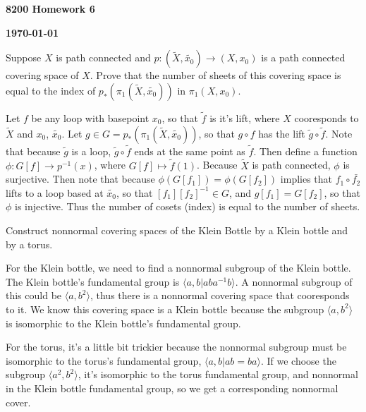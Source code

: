 \documentclass[12pt]{article}
\begin{document}
\begin{newtitle}
  \begin{center}
    \textbf{\Huge 8200 Homework 6}
  \end{center}
  \hfill \textbf{\today}
\end{newtitle}

\begin{statement}
  Suppose $X$ is path connected and $p: (\tilde{X},\tilde{x_0}) \to (X,x_0)$ is a path connected covering space of $X$. 
  Prove that the number of sheets of this covering space is equal to the index of $p_*(\pi_1(\tilde{X},\tilde{x_0}))$ 
  in $\pi_1(X,x_0)$.
\end{statement}

\begin{newproof}
  Let $f$ be any loop with basepoint $x_0$, so that $\tilde{f}$ is it's lift, where $X$ cooresponds to 
  $\tilde{X}$ and $x_0$, $\tilde{x_0}$. Let $g \in G=p_*(\pi_1(\tilde{X},\tilde{x_0}))$, so that $g \circ f$ has 
  the lift $\tilde{g} \circ \tilde{f}$. Note that because $\tilde{g}$ is a loop, $\tilde{g} \circ 
  \tilde{f}$ ends at the same point as $\tilde{f}$. Then define a function $\phi: G[f] \to p^{-1}(x)$, 
  where $G[f] \mapsto \tilde{f}(1)$. Because $\tilde{X}$ is path connected, $\phi$ is surjective. 
  Then note that because $\phi(G[f_1])=\phi(G[f_2])$ implies that $f_1 \circ \bar{f_2}$ 
  lifts to a loop based at $\tilde{x_0}$, so that $[f_1][f_2]^{-1} \in G$, and $g[f_1]=G[f_2]$, so 
  that $\phi$ is injective. Thus the number of cosets (index) is equal to the number of sheets. 
\end{newproof}

\begin{statement}
  Construct nonnormal covering spaces of the Klein Bottle by a Klein bottle and by a torus. 
\end{statement}

\begin{newproof}
  For the Klein bottle, we need to find a nonnormal subgroup of the Klein bottle. The Klein 
  bottle's fundamental group is $\langle a,b \vert aba^{-1}b \rangle$. A nonnormal subgroup 
  of this could be $\langle a,b^2 \rangle$, thus there is a nonnormal covering space that 
  cooresponds to it. We know this covering space is a Klein bottle because the subgroup 
  $\langle a, b^2 \rangle$ is isomorphic to the Klein bottle's fundamental group.  
  \par For the torus, it's a little bit trickier because the nonnormal subgroup must be 
  isomorphic to the torus's fundamental group, $\langle a,b \vert ab=ba \rangle$. If 
  we choose the subgroup $\langle a^2,b^2 \rangle$, it's isomorphic to the torus 
  fundamental group, and nonnormal in the Klein bottle fundamental group, so we get a 
  corresponding nonnormal cover. 
\end{newproof}
\end{document}
